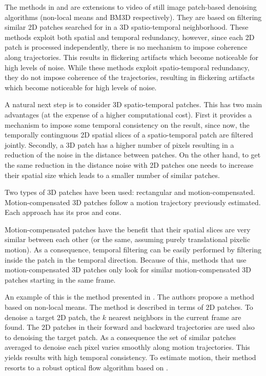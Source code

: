 \documentclass[10pt, journal, twocolumn, final, a4paper]{IEEEtran}
\begin{document}
The methods in \cite{Buades2005v} and \cite{Dabov2007v} are extensions to video
of still image patch-based denoising algorithms (non-local means \cite{Buades2006} and BM3D
\cite{Dabov2007tip} respectively). They are based on filtering similar 2D patches
searched for in a 3D spatio-temporal neighborhood. These methods exploit both
spatial and temporal redundancy, however, since each 2D patch is processed
independently, there is no mechanism to impose coherence along trajectories.
This results in flickering artifacts which become noticeable for high levels of
noise. 
%
While these methods exploit spatio-temporal redundancy, they do not impose
coherence of the trajectories, resulting in flickering
artifacts which become noticeable for high levels of noise. 

A natural next step is to consider 3D spatio-temporal patches. This has two
main advantages (at the expense of a higher computational cost). First it
provides a mechanism to impose some temporal consistency on the result, since
now, the temporally continguous 2D spatial slices of a spatio-temporal patch
are filtered jointly. Secondly, a 3D patch has a higher number of pixels
resulting in a reduction of the noise in the distance between patches. On the
other hand, to get the same reduction in the distance noise with 2D patches one
needs to increase their spatial size which leads to a smaller number of similar
patches.

Two types of 3D patches have been used: rectangular and motion-compensated.
Motion-compensated 3D patches follow a motion trajectory previously estimated.
Each approach has its pros and cons.

Motion-compensated patches have the benefit that their spatial slices are very
similar between each other (or the same, assuming purely translational pixelic
motion). As a consequence, temporal filtering can be easily performed by
filtering inside the patch in the temporal direction. 
Because of this, methods that use motion-compensated 3D patches only look for
similar motion-compensated 3D patches starting in the same frame.


%
An example of this is the method presented in \cite{Liu2010}. The authors
propose a method based on non-local means. The method is described in terms of
2D patches. To denoise a target 2D patch, the $k$ nearest neighbors in the current
frame are found. The 2D patches in their forward and backward trajectories are
used also to denoising the target patch. As a consequence the set of similar
patches averaged to denoise each pixel varies smoothly along motion
trajectories. This yields results with high temporal consistency. 
To estimate motion, their method resorts to a robust optical flow algorithm
based on \cite{Bruhn2005}.
\end{document}
